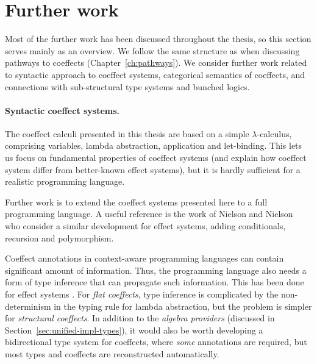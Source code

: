 \section{Further work}
\label{sec:conc-further}

Most of the further work has been discussed throughout the thesis, so this section
serves mainly as an overview. We follow the same structure as when discussing pathways to 
coeffects (Chapter~\ref{ch:pathways}). We consider further work related to syntactic approach
to coeffect systems, categorical semantics of coeffects, and connections with sub-structural type 
systems and bunched logics. 


\paragraph{Syntactic coeffect systems.}
The coeffect calculi presented in this thesis are based on a simple $\lambda$-calculus, comprising
variables, lambda abstraction, application and let-binding. This lets us focus on fundamental
properties of coeffect systems (and explain how coeffect system differ from better-known effect
systems), but it is hardly sufficient for a realistic programming language. 

Further work is to extend the coeffect systems presented here to a full programming language. A
useful reference is the work of Nielson and Nielson~\cite{effects-nielson} who consider a 
similar development for effect systems, adding conditionals, recursion and polymorphism.

Coeffect annotations in context-aware programming languages can contain significant amount
of information. Thus, the programming language also needs a form of type inference that can propagate
such information. This has been done for effect systems \cite{effects-polymorphic}. For 
\emph{flat coeffects}, type inference is complicated by the non-determinism in the typing rule
for lambda abstraction, but the problem is simpler for \emph{structural coeffects}. In addition
to the \emph{algebra providers} (discussed in Section~\ref{sec:unified-impl-types}), it would also
be worth developing a bidirectional type system \cite{types-bidirectional} for coeffects, where 
\emph{some} annotations are required, but most types and coeffects are reconstructed automatically.


